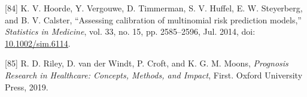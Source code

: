 \documentclass[
]{article}
\newenvironment{cslreferences}%
  {}%
  {\par}
\begin{document}
\begin{cslreferences}
\leavevmode\hypertarget{ref-hoorde_assessing_2014}{}%
{[}84{]} K. V. Hoorde, Y. Vergouwe, D. Timmerman, S. V. Huffel, E. W. Steyerberg, and B. V. Calster, ``Assessing calibration of multinomial risk prediction models,'' \emph{Statistics in Medicine}, vol. 33, no. 15, pp. 2585--2596, Jul. 2014, doi: \href{https://doi.org/10.1002/sim.6114}{10.1002/sim.6114}.

\leavevmode\hypertarget{ref-riley_prognosis_2019}{}%
{[}85{]} R. D. Riley, D. van der Windt, P. Croft, and K. G. M. Moons, \emph{Prognosis Research in Healthcare: Concepts, Methods, and Impact}, First. Oxford University Press, 2019.
\end{cslreferences}
\end{document}
